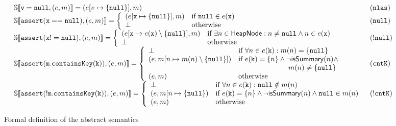 \begin{figure*}
\[\begin{array}{ll}
\mathbb{S}\llbracket \mathtt{v = null}, (e, m) \rrbracket =  (e[v \mapsto \{\mathtt{null}\}], m)& (\mathtt{nlas})\\
\mathbb{S}\llbracket \mathtt{assert(x==null)}, (e, m) \rrbracket = \left\{
\begin{array}{ll}
(e[\mathtt{x} \mapsto \{\mathtt{null}\}], m) & \textrm{if } \mathtt{null} \in e(\mathtt{x})\\
\bot & \textrm{otherwise}\\
\end{array}
\right. & (\mathtt{null})\\
\mathbb{S}\llbracket \mathtt{assert(x!=null)}, (e, m) \rrbracket = \left\{
\begin{array}{ll}
(e[\mathtt{x} \mapsto e(\mathtt{x}) \setminus \{\mathtt{null}\}], m) & \textrm{if } \exists n \in \mathsf{HeapNode} : n \neq \mathtt{null} \land n \in e(\mathtt{x})\\
\bot & \textrm{otherwise}\\
\end{array}
\right. & (\mathtt{!null})\\
\mathbb{S}\llbracket \mathtt{assert(m.containsKey(k))}, (e, m) \rrbracket = \left\{
\begin{array}{ll}
\bot & \textrm{if } \forall n \in e(\mathtt{k}) : m(n)=\{\mathtt{null}\}\\
(e, m[n \mapsto m(n)\setminus\{\mathtt{null}\}]) & \textrm{if } e(\mathtt{k}) = \{n\} \land \neg \mathsf{isSummary}(n) \land \\
& \hspace{70pt} m(n) \neq \{\mathtt{null}\}\\
(e, m) & \textrm{otherwise}\\
\end{array}
\right. & (\mathtt{cntK})\\
\mathbb{S}\llbracket \mathtt{assert(!m.containsKey(k))}, (e, m) \rrbracket = \left\{
\begin{array}{ll}
\bot & \textrm{if } \forall n \in e(\mathtt{k}) : \mathtt{null} \notin m(n)\\
(e, m[n \mapsto \{\mathtt{null}\}) & \textrm{if } e(\mathtt{k}) = \{n\} \land \neg \mathsf{isSummary}(n) \land \mathtt{null} \in m(n)\\
(e, m) & \textrm{otherwise}\\
\end{array}
\right. & (\mathtt{!cntK})\\
\end{array}
\]
\caption{Formal definition of the abstract semantics}
\label{fig:abstractsemantics}
\end{figure*}
